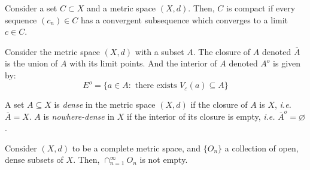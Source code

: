 
\begin{definition}[Compactness]
    Consider a set $C \subset X$ and a metric space $(X,d)$. Then, $C$ is compact if every sequence $(c_n) \in C$ has a convergent subsequence which converges to a limit $c \in C$.
\end{definition}

\begin{definition}
    Consider the metric space $(X, d)$ with a subset $A$. The closure of $A$ denoted $\overline{A}$ is the union of $A$ with its limit points. And the interior of $A$ denoted $A^{o}$ is given by:
    \begin{equation*}
        E^{o} = \{ a \in A : \text{ there exists } V_{\varepsilon}(a) \subseteq A\}
    \end{equation*}
\end{definition}

\begin{definition}
    A set $A \subseteq X$ is \emph{dense} in the metric space $(X, d)$ if the closure of $A$ is $X$, \emph{i.e.} $\overline{A} = X$. $A$ is \emph{nowhere-dense} in $X$ if the interior of its closure is empty, \emph{i.e.} $\overline{A}^o = \varnothing$.
\end{definition}

\begin{theorem}
    Consider $(X, d)$ to be a complete metric space, and $\{ O_n \}$ a collection of open, dense subsets of $X$. Then, $\cap_{n=1}^\infty O_n$ is not empty.
\end{theorem}